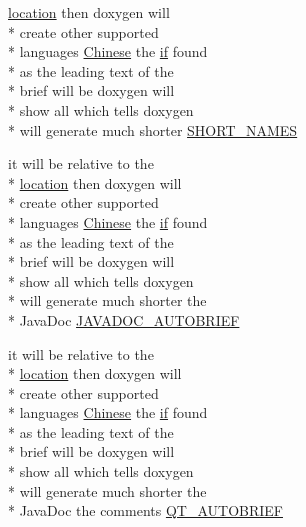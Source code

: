 \begin{DoxyCompactItemize}
\hyperlink{glext_8h_a6f0165ed903f22b8bb600c3e0b628e73}{location} then doxygen will \\*
create other supported \\*
languages \hyperlink{sdlgamepad_8dox_ab6ff97d2e5e9fa61c208d5f0eee91c62}{Chinese} the \hyperlink{qxtdiscoverableservice_8cpp_aa620047247d7e2a6894ad8ad666771de}{if} found \\*
as the leading text of the \\*
brief will be doxygen will \\*
show all which tells doxygen \\*
will generate much shorter \hyperlink{sdlgamepad_8dox_a8b98f3c06d38ae31f6e77655f4e4bf0a}{S\-H\-O\-R\-T\-\_\-\-N\-A\-M\-E\-S}
\item 
it will be relative to the \\*
\hyperlink{glext_8h_a6f0165ed903f22b8bb600c3e0b628e73}{location} then doxygen will \\*
create other supported \\*
languages \hyperlink{sdlgamepad_8dox_ab6ff97d2e5e9fa61c208d5f0eee91c62}{Chinese} the \hyperlink{qxtdiscoverableservice_8cpp_aa620047247d7e2a6894ad8ad666771de}{if} found \\*
as the leading text of the \\*
brief will be doxygen will \\*
show all which tells doxygen \\*
will generate much shorter the \\*
Java\-Doc \hyperlink{sdlgamepad_8dox_aabdcd7fd8cfe4a4c6f9ad5b932398ab2}{J\-A\-V\-A\-D\-O\-C\-\_\-\-A\-U\-T\-O\-B\-R\-I\-E\-F}
\item 
it will be relative to the \\*
\hyperlink{glext_8h_a6f0165ed903f22b8bb600c3e0b628e73}{location} then doxygen will \\*
create other supported \\*
languages \hyperlink{sdlgamepad_8dox_ab6ff97d2e5e9fa61c208d5f0eee91c62}{Chinese} the \hyperlink{qxtdiscoverableservice_8cpp_aa620047247d7e2a6894ad8ad666771de}{if} found \\*
as the leading text of the \\*
brief will be doxygen will \\*
show all which tells doxygen \\*
will generate much shorter the \\*
Java\-Doc the comments \hyperlink{sdlgamepad_8dox_ac0b206976e7e9c2197ff6f4a6104ed56}{Q\-T\-\_\-\-A\-U\-T\-O\-B\-R\-I\-E\-F}

\end{DoxyCompactItemize}
